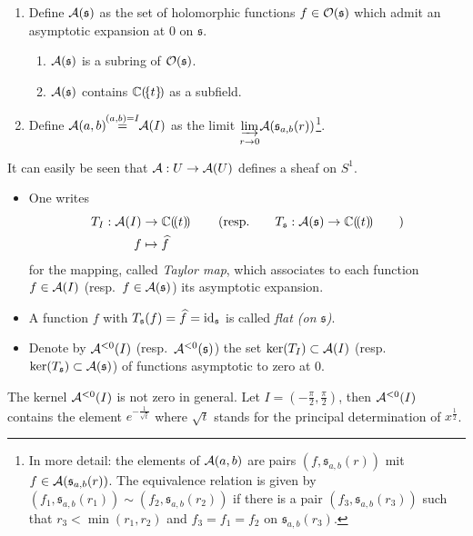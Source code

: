 \begin{defn}
  \begin{enumerate}
    \item Define $\mathcal{A}(\mathfrak{s})$ as the set of holomorphic functions
      $f\in\mathcal{O}(\mathfrak{s})$ which admit an asymptotic expansion at $0$ on
      $\mathfrak{s}$.
      \begin{s-rem}
        \begin{enumerate}
          \item
            $\mathcal{A}(\mathfrak{s})$ is a subring of $\mathcal{O}(\mathfrak{s})$.
          \item
            $\mathcal{A}(\mathfrak{s})$ contains $\mathbb{C}(\!\{t\}\!)$ as a subfield.
        \end{enumerate}
      \end{s-rem}
    \item Define $\mathcal{A}(a,b)\!\!\overset{(a,b)=I}{=}\!\!\mathcal{A}(I)$
      as the limit $\underset{r\to0}{\underrightarrow{\lim}}
      \mathcal{A}(\mathfrak{s}_{a,b}(r))$\footnote{In more detail: the
        elements of $\mathcal{A}(a,b)$ are pairs $(f,\mathfrak{s}_{a,b}(r))$ mit
        $f\in\mathcal{A}(\mathfrak{s}_{a,b}(r))$. The equivalence relation is given by
        $(f_1,\mathfrak{s}_{a,b}(r_1))\sim(f_2,\mathfrak{s}_{a,b}(r_2))$ if
      there is a pair $(f_3,\mathfrak{s}_{a,b}(r_3))$ such that
      $r_3<\min(r_1,r_2)$ and $f_3=f_1=f_2$ on $\mathfrak{s}_{a,b}(r_3)$.}.
  \end{enumerate}
\end{defn}
It can easily be seen that $\mathcal{A}:U\to\mathcal{A}(U)$ defines a sheaf on $S^1$.

\begin{defn}
  \begin{itemize}
    \item One writes
      \begin{align*}
        T_{I}:\mathcal{A}(I)&\to\mathbb{C}(\!(t)\!)
        \qquad\left(\text{resp.}\qquad
        T_{\mathfrak{s}}:\mathcal{A}(\mathfrak{s})\to\mathbb{C}(\!(t)\!)\qquad\right)
      \\f&\mapsto\widehat f
      \end{align*}
      for the mapping, called \emph{Taylor map}, which associates to each
      function $f\in\mathcal{A}(I)$ (resp.\ $f\in\mathcal{A}(\mathfrak{s})$) its asymptotic
      expansion.
    \item A function $f$ with $T_{\mathfrak{s}}(f)=\widehat f=\operatorname{id}_{\mathfrak{s}}$
      is called \emph{flat (on $\mathfrak{s}$)}. \TODO[resp]
    \item Denote by $\mathcal{A}^{<0}(I)$ (resp.\ $\mathcal{A}^{<0}(\mathfrak{s})$) the set
      $\ker(T_{I})\subset\mathcal{A}(I)$ (resp.\
      $\ker(T_{\mathfrak{s}})\subset\mathcal{A}(\mathfrak{s})$) of functions asymptotic
      to zero at $0$.
  \end{itemize}
\end{defn}
The kernel $\mathcal{A}^{<0}(I)$ is not zero in general.
Let $I=\left(-\frac{\pi}{2},\frac{\pi}{2}\right)$, then $\mathcal{A}^{<0}(I)$ contains
the element $e^{-\frac{1}{\sqrt{t}}}$ where $\sqrt{t}$ stands for the principal
determination of $x^{\frac{1}{2}}$.

